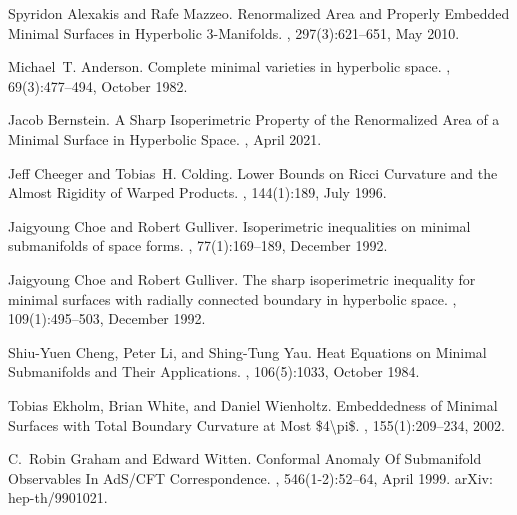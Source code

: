 \documentclass[11pt]{article}
\begin{document}
\begin{thebibliography}{EWW02}

Spyridon Alexakis and Rafe Mazzeo.
\newblock Renormalized {Area} and {Properly} {Embedded} {Minimal} {Surfaces} in
  {Hyperbolic} 3-{Manifolds}.
, 297(3):621--651, May 2010.

Michael~T. Anderson.
\newblock Complete minimal varieties in hyperbolic space.
, 69(3):477--494, October 1982.

Jacob Bernstein.
\newblock A {Sharp} {Isoperimetric} {Property} of the {Renormalized} {Area} of
  a {Minimal} {Surface} in {Hyperbolic} {Space}.
, April 2021.

Jeff Cheeger and Tobias~H. Colding.
\newblock Lower {Bounds} on {Ricci} {Curvature} and the {Almost} {Rigidity} of
  {Warped} {Products}.
, 144(1):189, July 1996.

Jaigyoung Choe and Robert Gulliver.
\newblock Isoperimetric inequalities on minimal submanifolds of space forms.
, 77(1):169--189, December 1992.

Jaigyoung Choe and Robert Gulliver.
\newblock The sharp isoperimetric inequality for minimal surfaces with radially
  connected boundary in hyperbolic space.
, 109(1):495--503, December 1992.

Shiu-Yuen Cheng, Peter Li, and Shing-Tung Yau.
\newblock Heat {Equations} on {Minimal} {Submanifolds} and {Their}
  {Applications}.
, 106(5):1033, October 1984.

Tobias Ekholm, Brian White, and Daniel Wienholtz.
\newblock Embeddedness of {Minimal} {Surfaces} with {Total} {Boundary}
  {Curvature} at {Most} \$4{\textbackslash}pi\$.
, 155(1):209--234, 2002.

C.~Robin Graham and Edward Witten.
\newblock Conformal {Anomaly} {Of} {Submanifold} {Observables} {In} {AdS}/{CFT}
  {Correspondence}.
, 546(1-2):52--64, April 1999.
\newblock arXiv: hep-th/9901021.


\end{thebibliography}
\end{document}
